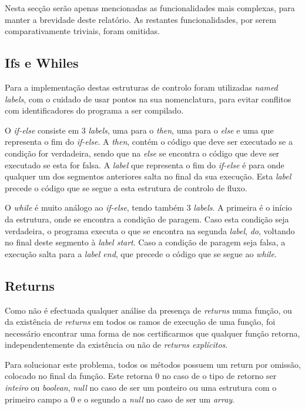 \documentclass[11pt,a4paper]{article}
\begin{document}
Nesta secção serão apenas mencionadas as funcionalidades mais complexas, para manter a brevidade deste relatório. As restantes funcionalidades, por serem comparativamente triviais, foram omitidas.

\subsection{Ifs e Whiles}

Para a implementação destas estruturas de controlo foram utilizadas \textit{named labels}, com o cuidado de usar pontos na sua nomenclatura, para evitar conflitos com identificadores do programa a ser compilado.

O \textit{if-else} consiste em 3 \textit{labels}, uma para o \textit{then}, uma para o \textit{else} e uma que representa o fim do \textit{if-else}. A \textit{then}, contém o código que deve ser executado se a condição for verdadeira, sendo que na \textit{else} se encontra o código que deve ser executado se esta for falsa. A \textit{label} que representa o fim do \textit{if-else} é para onde qualquer um dos segmentos anteriores salta no final da sua execução. Esta \textit{label} precede o código que se segue a esta estrutura de controlo de fluxo.

O \textit{while} é muito análogo ao \textit{if-else}, tendo também 3 \textit{labels}. A primeira é o início da estrutura, onde se encontra a condição de paragem. Caso esta condição seja verdadeira, o programa executa o que se encontra na segunda \textit{label}, \textit{do}, voltando no final deste segmento à \textit{label start}. Caso a condição de paragem seja falsa, a execução salta para a \textit{label end}, que precede o código que se segue ao \textit{while}.

\subsection{Returns}

Como não é efectuada qualquer análise da presença de \textit{returns} numa função, ou da existência de \textit{returns} em todos os ramos de execução de uma função, foi necessário encontrar uma forma de nos certificarmos que qualquer função retorna, independentemente da existência ou não de \textit{returns explícitos}.

Para solucionar este problema, todos os métodos possuem um return por omissão, colocado no final da função. Este retorna 0 no caso de o tipo de retorno ser \textit{inteiro} ou \textit{boolean}, \textit{null} no caso de ser um ponteiro ou uma estrutura com o primeiro campo a 0 e o segundo a \textit{null} no caso de ser um \textit{array}.
\end{document}
